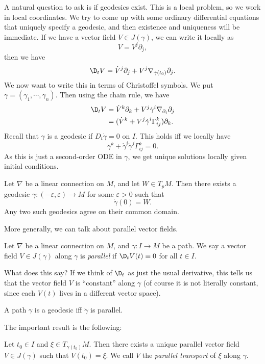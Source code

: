 \documentclass[a4paper]{article}
\begin{document}
A natural question to ask is if geodesics exist. This is a local problem, so we work in local coordinates. We try to come up with some ordinary differential equations that uniquely specify a geodesic, and then existence and uniqueness will be immediate. If we have a vector field $V \in J(\gamma)$, we can write it locally as
\[
  V = V^j \partial_j,
\]
then we have
\[
  \D_t V = \dot{V}^j \partial_j + V^j \nabla_{\dot{\gamma}(t_0)} \partial_j.
\]
We now want to write this in terms of Christoffel symbols. We put $\gamma = (\gamma_1, \cdots, \gamma_n)$. Then using the chain rule, we have
\begin{align*}
  \D_t V &= \dot{V}^k \partial_k + V^j \dot{\gamma}^i \nabla_{\partial_i} \partial_j\\
  &= (\dot{V}^k + V^j \dot{\gamma}^i \Gamma_{ij}^k)\partial_k.
\end{align*}
Recall that $\gamma$ is a geodesic if $D_t \dot{\gamma} = 0$ on $I$. This holds iff we locally have
\[
  \ddot{\gamma}^k + \dot{\gamma}^i \dot{\gamma}^j \Gamma_{ij}^k = 0.
\]
As this is just a second-order ODE in $\gamma$, we get unique solutions locally given initial conditions.\
\begin{thm}
  Let $\nabla$ be a linear connection on $M$, and let $W \in T_pM$. Then there exists a geodesic $\gamma: (-\varepsilon, \varepsilon) \to M$ for some $\varepsilon > 0$ such that
  \[
    \dot{\gamma}(0) = W.
  \]
  Any two such geodesics agree on their common domain.
\end{thm}

More generally, we can talk about parallel vector fields.
\begin{defi}
  Let $\nabla$ be a linear connection on $M$, and $\gamma: I \to M$ be a path. We say a vector field $V \in J(\gamma)$ along $\gamma$ is \emph{parallel} if $\D_t V(t) \equiv 0$ for all $t \in I$.
\end{defi}
What does this say? If we think of $\D_t$ as just the usual derivative, this tells us that the vector field $V$ is ``constant'' along $\gamma$ (of course it is not literally constant, since each $V(t)$ lives in a different vector space).

\begin{eg}
  A path $\gamma$ is a geodesic iff $\dot{\gamma}$ is parallel.
\end{eg}
The important result is the following:
\begin{lemma}
  Let $t_0 \in I$ and $\xi \in T_{\gamma(t_0)} M$. Then there exists a unique parallel vector field $V \in J(\gamma)$ such that $V(t_0) = \xi$. We call $V$ the \emph{parallel transport} of $\xi$ along $\gamma$.
\end{lemma}
\end{document}
